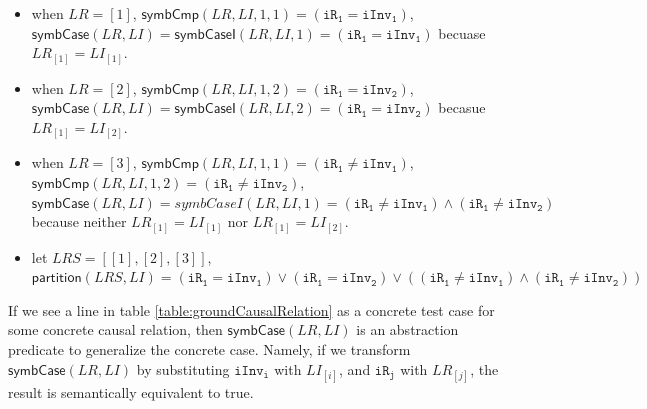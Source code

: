 \documentclass[final]{IEEEtran}
\def \eqc {=}
\def \iInv {iInv}
\def \iR {iR}
\begin{document}
\begin{itemize}

  \item when $LR=[1]$, $\mathsf{symbCmp}(LR,LI,1,1)=(\mathtt{\iR_1} \eqc \mathtt{\iInv_1})$, $\mathsf{symbCase}(LR,LI)=\mathsf{symbCaseI}(LR,LI,1)=(\mathtt{\iR_1} \eqc \mathtt{\iInv_1})$ becuase $LR_{[1]}=LI_{[1]}$.

  \item when $LR=[2]$, $\mathsf{symbCmp}(LR,LI,1,2)= (\mathtt{\iR_1} \eqc \mathtt{\iInv_2})$, $\mathsf{symbCase}(LR,LI)=\mathsf{symbCaseI}(LR,LI,2)=(\mathtt{\iR_1} \eqc \mathtt{\iInv_2})$ becasue $LR_{[1]}=LI_{[2]}$.


 \item when  $LR=[3]$, $\mathsf{symbCmp}(LR,LI,1,1)=(\mathtt{\iR_1} \ne \mathtt{\iInv_1})$, $\mathsf{symbCmp}(LR,LI,1,2) = (\mathtt{\iR_1} \ne \mathtt{\iInv_2})$, $\mathsf{symbCase}(LR,LI)=symbCaseI(LR,LI,1)= (\mathtt{\iR_1} \ne \mathtt{\iInv_1}) \wedge  (\mathtt{\iR_1} \ne \mathtt{\iInv_2})$ because neither $LR_{[1]}=LI_{[1]}$ nor $LR_{[1]}=LI_{[2]}$.

  \item let $LRS=[[1],[2],[3]]$, $\mathsf{partition}(LRS,LI)= (\mathtt{\iR_1} \eqc \mathtt{\iInv_1}) \vee (\mathtt{\iR_1} \eqc \mathtt{\iInv_2}) \vee ( (\mathtt{\iR_1} \ne \mathtt{\iInv_1}) \wedge  (\mathtt{\iR_1} \ne \mathtt{\iInv_2}))$
\end{itemize}

If we see a line  in table \ref{table:groundCausalRelation} as a concrete test case for some concrete causal relation,  then $\mathsf{symbCase}(LR, LI)$ is an abstraction predicate to generalize the concrete case. Namely, if we transform $\mathsf{symbCase}(LR, LI)$ by substituting $\mathtt{\iInv_i}$ with $LI_{[i]}$, and $\mathtt{\iR_j}$ with $LR_{[j]}$, the result is semantically equivalent to true. %
\end{document}
